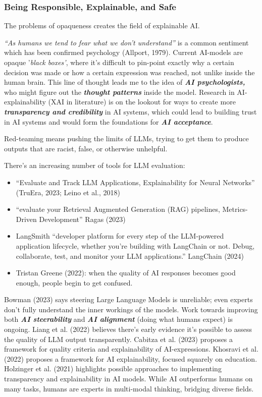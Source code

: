\documentclass[
  letterpaper,
  DIV=11,
  numbers=noendperiod]{scrartcl}
\begin{document}
\subsubsection{Being Responsible, Explainable, and
Safe}\label{being-responsible-explainable-and-safe}

The problems of opaqueness creates the field of explainable AI.

\emph{``As humans we tend to fear what we don't understand''} is a
common sentiment which has been confirmed psychology (Allport, 1979).
Current AI-models are opaque '\emph{black boxes'}, where it's difficult
to pin-point exactly why a certain decision was made or how a certain
expression was reached, not unlike inside the human brain. This line of
thought leads me to the idea of \textbf{\emph{AI psychologists,}} who
might figure out the \textbf{\emph{thought patterns}} inside the model.
Research in AI-explainability (XAI in literature) is on the lookout for
ways to create more \textbf{\emph{transparency and credibility}} in AI
systems, which could lead to building trust in AI systems and would form
the foundations for \textbf{\emph{AI acceptance}}.

Red-teaming means pushing the limits of LLMs, trying to get them to
produce outputs that are racist, false, or otherwise unhelpful.

There's an increasing number of tools for LLM evaluation:

\begin{itemize}
\item
  ``Evaluate and Track LLM Applications, Explainability for Neural
  Networks'' (TruEra, 2023; Leino et al., 2018)
\item
  ``evaluate your Retrieval Augmented Generation (RAG) pipelines,
  Metrics-Driven Development'' Ragas (2023)
\item
  LangSmith ``developer platform for every step of the LLM-powered
  application lifecycle, whether you're building with LangChain or not.
  Debug, collaborate, test, and monitor your LLM applications.''
  LangChain (2024)
\item
  Tristan Greene (2022): when the quality of AI responses becomes good
  enough, people begin to get confused.
\end{itemize}

Bowman (2023) says steering Large Language Models is unreliable; even
experts don't fully understand the inner workings of the models. Work
towards improving both \textbf{\emph{AI steerability}} and
\textbf{\emph{AI alignment}} (doing what humans expect) is ongoing.
Liang et al. (2022) believes there's early evidence it's possible to
assess the quality of LLM output transparently. Cabitza et al. (2023)
proposes a framework for quality criteria and explainability of
AI-expressions. Khosravi et al. (2022) proposes a framework for AI
explainability, focused squarely on education. Holzinger et al. (2021)
highlights possible approaches to implementing transparency and
explainability in AI models. While AI outperforms humans on many tasks,
humans are experts in multi-modal thinking, bridging diverse fields.
\end{document}
